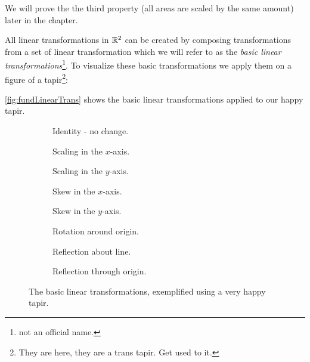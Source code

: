 We will prove the the third property (all areas are scaled by the same amount) later in the chapter.

All linear transformations in $\mathbb{R}^{2}$ can be created by composing transformations from a set of linear transformation which we will refer to as the \emph{basic linear transformations}\footnote{not an official name.}. To visualize these basic transformations we apply them on a figure of a tapir\footnote{They are here, they are a trans tapir. Get used to it.}:

\begin{figure}[H]
	\centering
\end{figure}

\autoref{fig:fundLinearTrans} shows the basic linear transformations applied to our happy tapir.

\begin{figure}[H]
	\centering
	\begin{subfigure}[c]{0.29\textwidth}
		\centering
		\caption{Identity - no change.}
		\label{fig:}
	\end{subfigure}
	\begin{subfigure}[c]{0.37\textwidth}
		\centering
		\caption{Scaling in the $x$-axis.}
		\label{fig:}
	\end{subfigure}
	\begin{subfigure}[c]{0.29\textwidth}
		\centering
		\caption{Scaling in the $y$-axis.}
		\label{fig:}
	\end{subfigure}
	\hfill
	\begin{subfigure}[c]{0.3\textwidth}
		\centering
		\caption{Skew in the $x$-axis.}
		\label{fig:}
	\end{subfigure}
	\begin{subfigure}[c]{0.3\textwidth}
		\centering
		\caption{Skew in the $y$-axis.}
		\label{fig:}
	\end{subfigure}
	\begin{subfigure}[c]{0.35\textwidth}
		\centering
		\caption{Rotation around origin.}
		\label{fig:}
	\end{subfigure}
	\hfill
	\begin{subfigure}[c]{0.3\textwidth}
		\centering
		\caption{Reflection about line.}
		\label{fig:}
	\end{subfigure}
	\begin{subfigure}[c]{0.3\textwidth}
		\centering
		\caption{Reflection through origin.}
		\label{fig:}
	\end{subfigure}
	\caption{The basic linear transformations, exemplified using a very happy tapir.}
	\label{fig:fundLinearTrans}
\end{figure}

